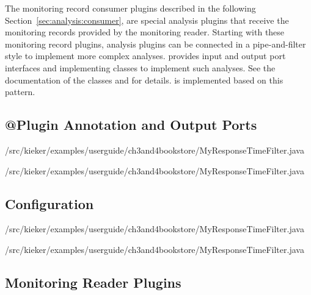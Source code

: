 The monitoring record consumer plugins described in the following %
Section~\ref{sec:analysis:consumer}, are special analysis plugins that receive %
the monitoring records provided by the monitoring reader. %
Starting with these monitoring record plugins, analysis plugins can be connected %
in a pipe-and-filter style to implement more complex analyses. %
\Kieker{} provides input and output port interfaces and implementing classes %
to implement such analyses. See the documentation of the classes  %
and  for details. \KiekerTraceAnalysis{} is implemented %
based on this pattern. 

\subsection{@Plugin Annotation and Output Ports}

\setJavaCodeListing
%
{\customComponentsBookstoreApplicationDir/src/kieker/examples/userguide/ch3and4bookstore/MyResponseTimeFilter.java}

\setJavaCodeListing
%
{\customComponentsBookstoreApplicationDir/src/kieker/examples/userguide/ch3and4bookstore/MyResponseTimeFilter.java}

\subsection{Configuration}

\setJavaCodeListing
%
{\customComponentsBookstoreApplicationDir/src/kieker/examples/userguide/ch3and4bookstore/MyResponseTimeFilter.java}

\setJavaCodeListing
%
{\customComponentsBookstoreApplicationDir/src/kieker/examples/userguide/ch3and4bookstore/MyResponseTimeFilter.java}

\subsection{Monitoring Reader Plugins}\label{sec:analysis:reader}

